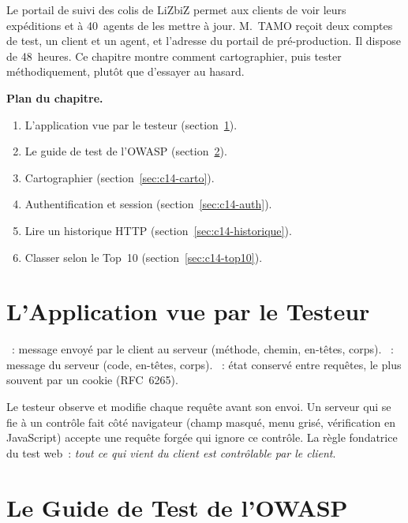Le portail de suivi des colis de LiZbiZ permet aux clients de voir leurs
expéditions et à 40~agents de les mettre à jour. M.~TAMO reçoit deux comptes
de test, un client et un agent, et l'adresse du portail de pré-production.
Il dispose de 48~heures. Ce chapitre montre comment cartographier, puis
tester méthodiquement, plutôt que d'essayer au hasard.

\medskip
\textbf{Plan du chapitre.}
\begin{enumerate}
    \item L'application vue par le testeur (section~\ref{sec:c14-modele}).
    \item Le guide de test de l'OWASP (section~\ref{sec:c14-wstg}).
    \item Cartographier (section~\ref{sec:c14-carto}).
    \item Authentification et session (section~\ref{sec:c14-auth}).
    \item Lire un historique HTTP (section~\ref{sec:c14-historique}).
    \item Classer selon le Top~10 (section~\ref{sec:c14-top10}).
\end{enumerate}

\separateur

\section{L'Application vue par le Testeur}
\label{sec:c14-modele}

\begin{boxdef}
~: message envoyé par le client au serveur (méthode,
chemin, en-têtes, corps). ~: message du serveur
(code, en-têtes, corps). ~: état conservé entre requêtes,
le plus souvent par un cookie (RFC~6265).
\end{boxdef}

Le testeur observe et modifie chaque requête avant son envoi. Un serveur
qui se fie à un contrôle fait côté navigateur (champ masqué, menu grisé,
vérification en JavaScript) accepte une requête forgée qui ignore ce
contrôle. La règle fondatrice du test web~: \emph{tout ce qui vient du
client est contrôlable par le client}.

\section{Le Guide de Test de l'OWASP}
\label{sec:c14-wstg}


